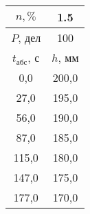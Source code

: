 \begin{tabular}[t]{|c|c|}
\hline
$n, \%$ & 1.5 \\
\hline
$P$, дел & 100 \\
\hline
$t_{абс}$, с & $h$, мм \\ 
\hline
0,0 & 200,0 \\ 
27,0 & 195,0 \\ 
56,0 & 190,0 \\ 
87,0 & 185,0 \\ 
115,0 & 180,0 \\ 
147,0 & 175,0 \\ 
177,0 & 170,0 \\ 
\hline
\end{tabular}
